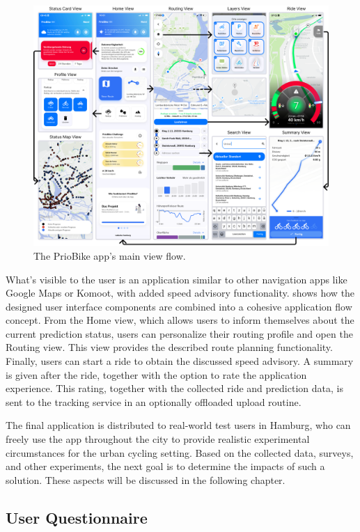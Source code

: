 \begin{figure}[htbp]
\caption{The PrioBike app's main view flow.}\label{fig:app}
\includegraphics[width=\linewidth]{images/app.png}
\end{figure}

What's visible to the user is an application similar to other navigation apps like Google Maps or Komoot, with added speed advisory functionality.  shows how the designed user interface components are combined into a cohesive application flow concept. From the Home view, which allows users to inform themselves about the current prediction status, users can personalize their routing profile and open the Routing view. This view provides the described route planning functionality. Finally, users can start a ride to obtain the discussed speed advisory. A summary is given after the ride, together with the option to rate the application experience. This rating, together with the collected ride and prediction data, is sent to the tracking service in an optionally offloaded upload routine.

The final application is distributed to real-world test users in Hamburg, who can freely use the app throughout the city to provide realistic experimental circumstances for the urban cycling setting. Based on the collected data, surveys, and other experiments, the next goal is to determine the impacts of such a solution. These aspects will be discussed in the following chapter.

\subsection{User Questionnaire}

